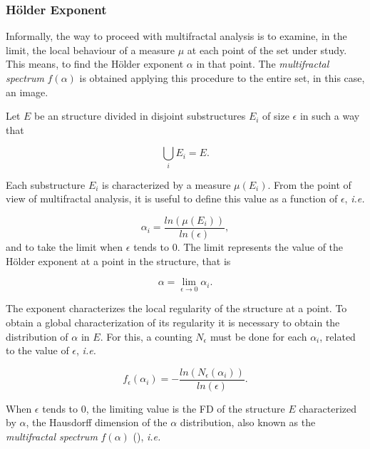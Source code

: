 \documentclass[oneside,a4paper,english,links]{amca}
\begin{document}
\subsubsection{H\"older Exponent}
Informally, the way to proceed with multifractal analysis is to examine, in the limit, the local behaviour of a measure $\mu$ at each point of the set under study. This means, to find the H\"older exponent $\alpha$ in that point. The {\em multifractal spectrum} $f(\alpha)$ is obtained applying this procedure to the entire set, in this case, an image.

Let $E$ be an structure divided in disjoint substructures $E_{i}$ of size $\epsilon$ in such a way that 

\begin{equation}
\displaystyle\bigcup_{i}E_{i} = E.
\end{equation}

Each substructure $E_{i}$ is characterized by a measure $\mu(E_{i})$. From the point of view of multifractal analysis, it is useful to define this value as a function of $\epsilon$, {\em i.e.}


\begin{equation}
\alpha_{i} = \frac{ln(\mu(E_{i}))}{ln(\epsilon)},
\label{eqn:eqn4}
\end{equation}
\noindent
and to take the limit when $\epsilon$ tends to $0$. The limit represents the value of the H\"older exponent at a point in the structure, that is

\begin{equation}
\alpha = \lim_{\epsilon\to0}{\alpha_{i}}.
\label{eqn:eqn5}
\end{equation}

The exponent characterizes the local regularity of the structure at a point. To obtain a global characterization of its regularity it is necessary to obtain the distribution of $\alpha$ in $E$. For this, a counting $N_{\epsilon}$ must be done for each $\alpha_{i}$, related to the value of $\epsilon$, {\em i.e.}

\begin{equation}
f_{\epsilon}(\alpha_{i}) = - \frac{ln(N_{\epsilon}(\alpha_{i}))}{ln(\epsilon)}.
\label{eqn:eqn6}
\end{equation}

When $\epsilon$ tends to $0$, the limiting value is the FD of the structure $E$ characterized by $\alpha$, the Hausdorff dimension of the $\alpha$ distribution, also known as the {\em multifractal spectrum} $f(\alpha)$ (\cite{Silvetti2010}), {\em i.e.}
\end{document}
